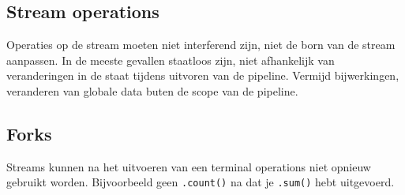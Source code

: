 \subsection{Stream operations}
Operaties op de stream moeten niet interferend zijn, niet de born van de stream aanpassen.
In de meeste gevallen staatloos zijn, niet afhankelijk van veranderingen in de staat tijdens uitvoren van de pipeline.
Vermijd bijwerkingen, veranderen van globale data buten de scope van de pipeline.

\subsection{Forks}
Streams kunnen na het uitvoeren van een terminal operations niet opnieuw gebruikt worden.
Bijvoorbeeld geen \texttt{.count()} na dat je \texttt{.sum()} hebt uitgevoerd.
